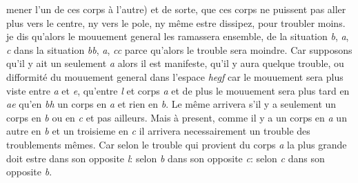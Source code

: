                           mener l'un de ces corps \`{a} l'autre) et de sorte, que ces corps ne puissent pas aller plus vers le centre, ny vers le pole, ny même estre dissipez, pour troubler moins.  je dis qu'alors le mouuement general les ramassera ensemble,  de la situation \textit{b}, \textit{a}, \textit{c} dans la situation \textit{bb}, \textit{a}, \textit{cc} parce qu'alors le trouble sera moindre. Car supposons qu'il y ait un  seulement \textit{a} alors il est manifeste, qu'il y aura quelque trouble, ou difformit\'{e} du mouuement general dans l'espace \textit{hegf} car le mouuement sera plus viste entre \textit{a} et \textit{e}, qu'entre \textit{l} et  corps \textit{a} et de plus le mouuement  sera plus tard en \textit{ae} qu'en \textit{bh}  un corps en \textit{a} et rien en \textit{b}. Le même arrivera s'il y a seulement un corps en \textit{b} ou en \textit{c} et pas ailleurs. Mais \`{a} present, comme il y a un corps en \textit{a} un autre en \textit{b} et un troisieme en \textit{c} il arrivera necessairement un trouble des troublements mêmes. Car selon le trouble qui provient du corps \textit{a} la plus grande  doit estre dans son opposite \textit{l}\hspace{-0.2em}: selon \textit{b} dans son opposite \textit{c}\hspace{-0.2em}: selon \textit{c} dans son opposite \textit{b}. 